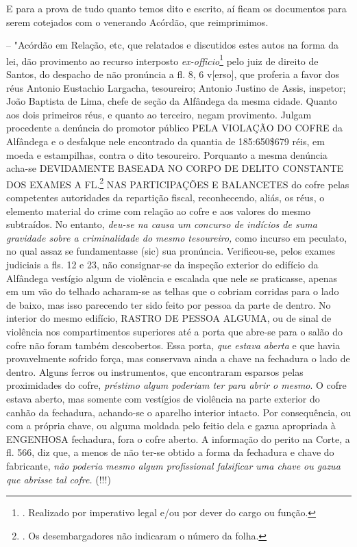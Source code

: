 E para a prova de tudo quanto temos dito e escrito, aí ficam os
documentos para serem cotejados com o venerando Acórdão, que
reimprimimos.

-- "Acórdão em Relação, etc, que relatados e discutidos estes autos na
forma da lei, dão provimento ao recurso interposto
\emph{ex-officio}\footnote{. Realizado por imperativo legal e/ou por
  dever do cargo ou função.} pelo juiz de direito de Santos, do despacho
de não pronúncia a fl. 8, 6 v{[}erso{]}, que proferia a favor dos réus
Antonio Eustachio Largacha, tesoureiro; Antonio Justino de Assis,
inspetor; João Baptista de Lima, chefe de seção da Alfândega da mesma
cidade. Quanto aos dois primeiros réus, e quanto ao terceiro, negam
provimento. Julgam procedente a denúncia do promotor público PELA
VIOLAÇÃO DO COFRE da Alfândega e o desfalque nele encontrado da quantia
de 185:650\$679 réis, em moeda e estampilhas, contra o dito tesoureiro.
Porquanto a mesma denúncia acha-se DEVIDAMENTE BASEADA NO CORPO DE
DELITO CONSTANTE DOS EXAMES A FL.\footnote{. Os desembargadores não
  indicaram o número da folha.} NAS PARTICIPAÇÕES E BALANCETES do cofre
pelas competentes autoridades da repartição fiscal, reconhecendo, aliás,
os réus, o elemento material do crime com relação ao cofre e aos valores
do mesmo subtraídos. No entanto, \emph{deu-se na causa um concurso de
indícios de suma gravidade sobre a criminalidade do mesmo tesoureiro,}
como incurso em peculato, no qual assaz se fundamentasse (sic) sua
pronúncia. Verificou-se, pelos exames judiciais a fls. 12 e 23, não
consignar-se da inspeção exterior do edifício da Alfândega vestígio
algum de violência e escalada que nele se praticasse, apenas em um vão
do telhado acharam-se as telhas que o cobriam corridas para o lado de
baixo, mas isso parecendo ter sido feito por pessoa da parte de dentro.
No interior do mesmo edifício, RASTRO DE PESSOA ALGUMA, ou de sinal de
violência nos compartimentos superiores até a porta que abre-se para o
salão do cofre não foram também descobertos. Essa porta, \emph{que
estava aberta} e que havia provavelmente sofrido força, mas conservava
ainda a chave na fechadura o lado de dentro. Alguns ferros ou
instrumentos, que encontraram esparsos pelas proximidades do cofre,
\emph{préstimo algum poderiam ter para abrir o mesmo}. O cofre estava
aberto, mas somente com vestígios de violência na parte exterior do
canhão da fechadura, achando-se o aparelho interior intacto. Por
consequência, ou com a própria chave, ou alguma moldada pelo feitio dela
e gazua apropriada à ENGENHOSA fechadura, fora o cofre aberto. A
informação do perito na Corte, a fl. 566, diz que, a menos de não ter-se
obtido a forma da fechadura e chave do fabricante, \emph{não poderia
mesmo algum profissional falsificar uma chave ou gazua que abrisse tal
cofre.} (!!!)

